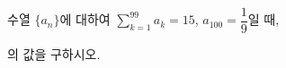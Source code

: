 수열 $\{a_n\}$에 대하여 $\displaystyle\sum_{k=1}^{99}a_k=15$, $a_{100}=\dfrac{1}{9}$일 때, \par\smallskip{}\par\smallskip\noindent 의 값을 구하시오.

